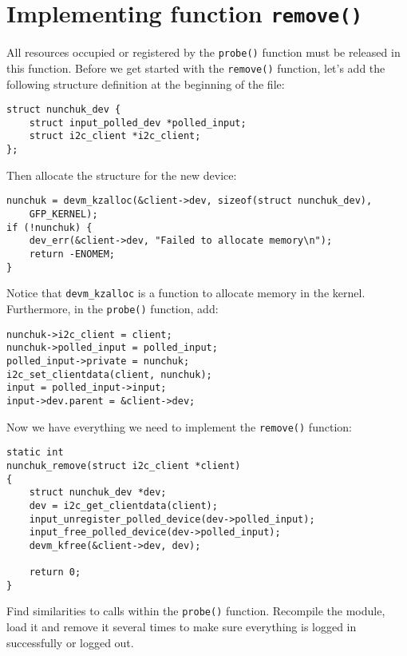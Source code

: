 \documentclass[11pt]{article}
\begin{document}
\section{Implementing function \texttt{remove()}}
All resources occupied or registered by the \texttt{probe()} function must be
 released in this function.
\newline
Before we get started with the \texttt{remove()} function, let's add the
 following structure definition at the beginning of the file:
\begin{lstlisting}
struct nunchuk_dev {
	struct input_polled_dev *polled_input;
	struct i2c_client *i2c_client;
};
\end{lstlisting}
Then allocate the structure for the new device:
\begin{lstlisting}
nunchuk = devm_kzalloc(&client->dev, sizeof(struct nunchuk_dev),
	GFP_KERNEL);
if (!nunchuk) {
	dev_err(&client->dev, "Failed to allocate memory\n");
	return -ENOMEM;
}
\end{lstlisting}
Notice that \texttt{devm\_kzalloc} is a function to allocate memory in the
 kernel.
Furthermore, in the \texttt{probe()} function, add:
\begin{lstlisting}
nunchuk->i2c_client = client;
nunchuk->polled_input = polled_input;
polled_input->private = nunchuk;
i2c_set_clientdata(client, nunchuk);
input = polled_input->input;
input->dev.parent = &client->dev;
\end{lstlisting}
Now we have everything we need to implement the \texttt{remove()} function:
\begin{lstlisting}
static int
nunchuk_remove(struct i2c_client *client)
{
	struct nunchuk_dev *dev;
	dev = i2c_get_clientdata(client);
	input_unregister_polled_device(dev->polled_input);
	input_free_polled_device(dev->polled_input);
	devm_kfree(&client->dev, dev);

	return 0;
}
\end{lstlisting}
Find similarities to calls within the \texttt{probe()} function.
\newline
Recompile the module, load it and remove it several times to make sure
 everything is logged in successfully or logged out.
\end{document}
